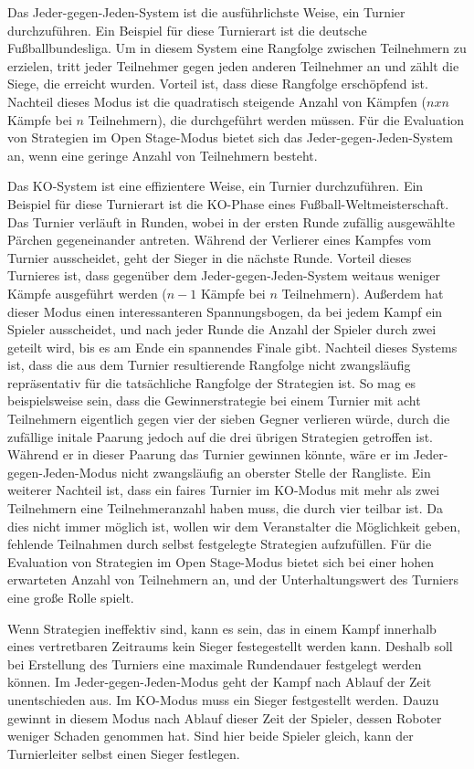 Das Jeder-gegen-Jeden-System ist die ausführlichste Weise, ein Turnier durchzuführen. Ein Beispiel
für diese Turnierart ist die deutsche Fußballbundesliga. Um in diesem System eine Rangfolge zwischen
Teilnehmern zu erzielen, tritt jeder Teilnehmer gegen jeden anderen Teilnehmer an und zählt die
Siege, die erreicht wurden. Vorteil ist, dass diese Rangfolge erschöpfend ist. Nachteil dieses
Modus ist die quadratisch steigende Anzahl von Kämpfen ($n x n$ Kämpfe bei $n$ Teilnehmern),
die durchgeführt werden müssen. Für die Evaluation von Strategien im Open Stage-Modus bietet sich das
Jeder-gegen-Jeden-System an, wenn eine geringe Anzahl von Teilnehmern besteht.

Das KO-System ist eine effizientere Weise, ein Turnier durchzuführen. Ein Beispiel für diese
Turnierart ist die KO-Phase eines Fußball-Weltmeisterschaft. Das Turnier verläuft in Runden, wobei
in der ersten Runde zufällig ausgewählte Pärchen gegeneinander antreten. Während der Verlierer eines
Kampfes vom Turnier ausscheidet, geht der Sieger in die nächste Runde. Vorteil dieses Turnieres ist,
dass gegenüber dem Jeder-gegen-Jeden-System weitaus weniger Kämpfe ausgeführt werden ($n - 1$ Kämpfe
bei $n$ Teilnehmern). Außerdem hat dieser Modus einen interessanteren Spannungsbogen, da bei jedem
Kampf ein Spieler ausscheidet, und nach jeder Runde die Anzahl der Spieler durch zwei geteilt wird,
bis es am Ende ein spannendes Finale gibt. Nachteil dieses Systems ist, dass die aus dem Turnier
resultierende Rangfolge nicht zwangsläufig repräsentativ für die tatsächliche Rangfolge der
Strategien ist. So mag es beispielsweise sein, dass die Gewinnerstrategie bei einem Turnier mit acht
Teilnehmern eigentlich gegen vier der sieben Gegner verlieren würde, durch die zufällige initale
Paarung jedoch auf die drei übrigen Strategien getroffen ist. Während er in dieser Paarung das
Turnier gewinnen könnte, wäre er im Jeder-gegen-Jeden-Modus nicht zwangsläufig an oberster Stelle
der Rangliste. Ein weiterer Nachteil ist, dass ein faires Turnier im KO-Modus mit mehr als zwei
Teilnehmern eine Teilnehmeranzahl haben muss, die durch vier teilbar ist. Da dies nicht immer
möglich ist, wollen wir dem Veranstalter die Möglichkeit geben, fehlende Teilnahmen durch selbst
festgelegte Strategien aufzufüllen. Für die Evaluation von Strategien im Open Stage-Modus bietet
sich bei einer hohen erwarteten Anzahl von Teilnehmern an, und der Unterhaltungswert des Turniers
eine große Rolle spielt. 

Wenn Strategien ineffektiv sind, kann es sein, das in einem Kampf innerhalb eines vertretbaren
Zeitraums kein Sieger festegestellt werden kann. Deshalb soll bei Erstellung des Turniers eine
maximale Rundendauer festgelegt werden können. Im Jeder-gegen-Jeden-Modus geht der Kampf nach Ablauf
der Zeit unentschieden aus. Im KO-Modus muss ein Sieger festgestellt werden. Dauzu gewinnt in
diesem Modus nach Ablauf dieser Zeit der Spieler, dessen Roboter weniger Schaden genommen hat. Sind
hier beide Spieler gleich, kann der Turnierleiter selbst einen Sieger festlegen.

